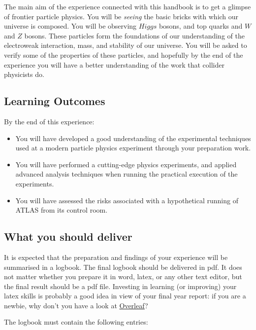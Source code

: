
The main aim of the experience connected with this handbook is to get a glimpse of frontier particle physics. You will be \textit{seeing} the basic bricks with which our universe is composed. You will be observing $Higgs$ bosons, and top quarks and $W$ and $Z$ bosons. These particles form the foundations of our understanding of the electroweak interaction, mass, and stability of our universe. You will be asked to verify some of the properties of these particles, and hopefully by the end of the experience you will have a better understanding of the work that collider physicists do. 

\subsection{Learning Outcomes}

By the end of this experience: 

\begin{itemize}
\item You will have developed a good understanding of the experimental techniques used at a modern particle physics experiment through your preparation work.
\item You will have performed a cutting-edge physics experiments, and applied advanced analysis techniques when running the practical execution of the experiments.
\item You will have assessed the risks associated with a hypothetical running of ATLAS from its control room. 
\end{itemize}

\subsection{What you should deliver}

It is expected that the preparation and findings of your experience will be summarised in a logbook. The final logbook should be delivered in pdf. It does not matter whether you prepare it in word, latex, or any other text editor, but the final result should be a pdf file. Investing in learning (or improving) your latex skills is probably a good idea in view of your final year report: if you are a newbie, why don't you have a look at \href{https://www.overleaf.com}{Overleaf}? 

The logbook must contain the following entries: 

